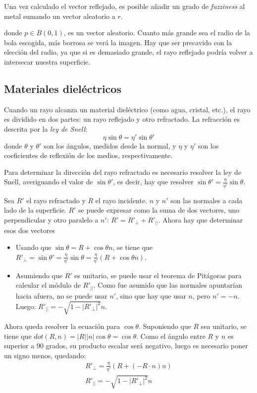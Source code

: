 Una vez calculado el vector reflejado, es posible añadir un grado de \textit{fuzziness} al metal sumando un vector aleatorio a $r$. 



donde $p\in B(0,1)$, es un vector aleatorio. Cuanto más grande sea el radio de la bola escogida, más borrosa se verá la imagen. Hay que ser precavido con la elección del radio, ya que si es demasiado grande, el rayo reflejado podría volver a intersecar nuestra superficie.

\subsection{Materiales dieléctricos}

Cuando un rayo alcanza un material dieléctrico (como agua, cristal, etc.), el rayo es dividido en dos partes: un rayo reflejado y otro refractado. La refracción es descrita por la \textit{ley de Snell}:
\[
\eta\sin\theta=\eta'\sin\theta'
\]
donde $\theta$ y $\theta'$ son los ángulos, medidos desde la normal, y $\eta$ y $\eta'$ son los coeficientes de reflexión de los medios, respectivamente.


Para determinar la dirección del rayo refractado es necesario resolver la ley de Snell, averiguando el valor de $\sin\theta'$, es decir, hay que resolver $\sin\theta'=\frac{\eta}{\eta'}\sin\theta$.


Sea $R'$ el rayo refractado y $R$ el rayo incidente. $n$ y $n'$ son las normales a cada lado de la superficie. $R'$ se puede expresar como la suma de dos vectores, uno perpendicular y otro paralelo a $n'$: $R'=R'_{\perp}+R'_{||}$. Ahora hay que determinar esos dos vectores

\begin{itemize}
\item Usando que $\sin\theta=R+\cos\theta n$, se tiene que $R'_{\perp}=\sin\theta'=\frac{\eta}{\eta'}\sin\theta=\frac{\eta}{\eta'}(R+\cos\theta n)$.
\item Asumiendo que $R'$ es unitario, se puede usar el teorema de Pitágoras para calcular el módulo de $R'_{||}$. Como fue asumido que las normales apuntarían hacia afuera, no se puede usar $n'$, sino que hay que usar $n$, pero $n'=-n$. Luego: $R'_{||}=-\sqrt{1-|R'_{\perp}|^2}n$.
\end{itemize}

Ahora queda resolver la ecuación para $\cos\theta$. Suponiendo que $R$ sea unitario, se tiene que $dot(R,n)=|R||n|\cos\theta=\cos\theta$. Como el ángulo entre $R$ y $n$ es superior a 90 grados, su producto escalar será negativo, luego es necesario poner un signo menos, quedando:
\[
\begin{array}{ll}
R'_{\perp}=\frac{\eta}{\eta'}(R+(-R\cdot n)n)\\
R'_{||}=-\sqrt{1-|R'_{\perp}|^2}n
\end{array}
\]

